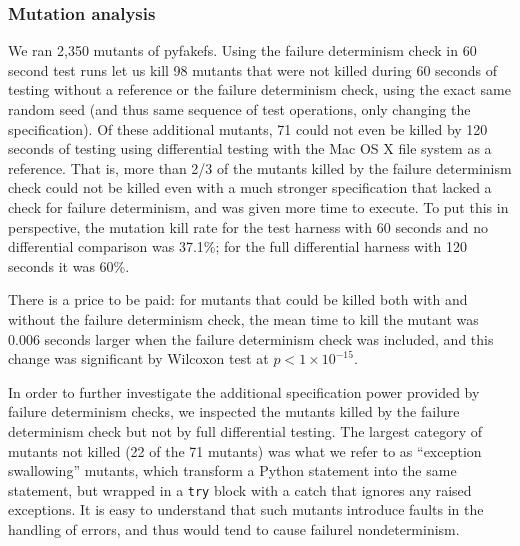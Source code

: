 \subsubsection{Mutation analysis}

We ran 2,350 mutants of pyfakefs.  Using the failure determinism check
in 60 second test runs let us kill 98 mutants that were not killed
during 60 seconds of testing without a reference or the failure
determinism check, using the exact same random seed (and thus same
sequence of test operations, only changing the specification).  Of
these additional mutants, 71 could not even be killed by 120
seconds of testing using differential testing with the Mac OS X file system
as a reference.  That is, more than 2/3 of the mutants killed by the
failure determinism check could not be killed even with a much
stronger specification that lacked a check for failure determinism,
and was given more time to execute.  To put this in perspective, the
mutation kill rate for the test harness with 60 seconds and no
differential comparison was 37.1\%; for the full differential harness
with 120 seconds it was 60\%.

There is a price to be paid:  for mutants that could be killed both
with and without the failure determinism check, the mean time to kill
the mutant was 0.006 seconds larger when the failure determinism
check was included, and this change was significant by Wilcoxon test
at $p < 1 \times 10^{-15}$.  

In order to further investigate the additional specification power
provided by failure determinism checks, we inspected the mutants
killed by the failure determinism check but not by full differential
testing.  The largest category of mutants not killed (22 of the 71 mutants) was what we refer
to as ``exception swallowing'' mutants, which transform a Python
statement into the same statement, but wrapped in a {\tt try} block
with a catch that ignores any raised exceptions.  It is easy to
understand that such mutants introduce faults in the handling of
errors, and thus would tend to cause failurel nondeterminism.
